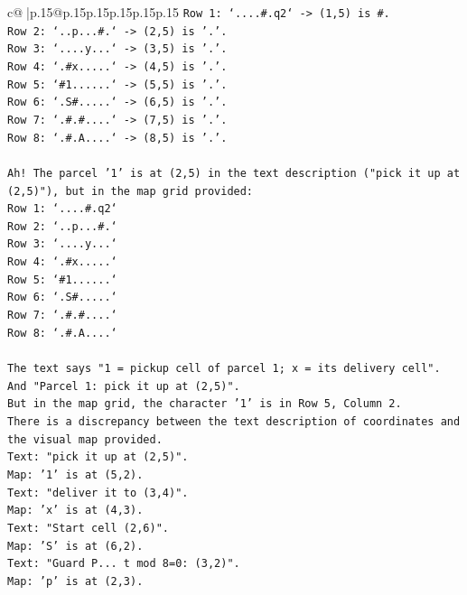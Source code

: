 \documentclass{article}
\begin{document}
{\begin{supertabular}{c@{$\;$}|p{.15\linewidth}@{}p{.15\linewidth}p{.15\linewidth}p{.15\linewidth}p{.15\linewidth}p{.15\linewidth}}
{{{\texttt{Row 1: `....\#.q2` {-}> (1,5) is \#.} \\
\texttt{Row 2: `..p...\#.` {-}> (2,5) is '.'.} \\
\texttt{Row 3: `....y...` {-}> (3,5) is '.'.} \\
\texttt{Row 4: `.\#x.....` {-}> (4,5) is '.'.} \\
\texttt{Row 5: `\#1......` {-}> (5,5) is '.'.} \\
\texttt{Row 6: `.S\#.....` {-}> (6,5) is '.'.} \\
\texttt{Row 7: `.\#.\#....` {-}> (7,5) is '.'.} \\
\texttt{Row 8: `.\#.A....` {-}> (8,5) is '.'.} \\
\\ 
\texttt{Ah! The parcel '1' is at (2,5) in the text description ("pick it up at (2,5)"), but in the map grid provided:} \\
\texttt{Row 1: `....\#.q2`} \\
\texttt{Row 2: `..p...\#.`} \\
\texttt{Row 3: `....y...`} \\
\texttt{Row 4: `.\#x.....`} \\
\texttt{Row 5: `\#1......`} \\
\texttt{Row 6: `.S\#.....`} \\
\texttt{Row 7: `.\#.\#....`} \\
\texttt{Row 8: `.\#.A....`} \\
\\ 
\texttt{The text says "1 = pickup cell of parcel 1; x = its delivery cell".} \\
\texttt{And "Parcel 1: pick it up at (2,5)".} \\
\texttt{But in the map grid, the character '1' is in Row 5, Column 2.} \\
\texttt{There is a discrepancy between the text description of coordinates and the visual map provided.} \\
\texttt{Text: "pick it up at (2,5)".} \\
\texttt{Map: '1' is at (5,2).} \\
\texttt{Text: "deliver it to (3,4)".} \\
\texttt{Map: 'x' is at (4,3).} \\
\texttt{Text: "Start cell (2,6)".} \\
\texttt{Map: 'S' is at (6,2).} \\
\texttt{Text: "Guard P... t mod 8=0: (3,2)".} \\
\texttt{Map: 'p' is at (2,3).} \\
}}}
\end{supertabular}}
\end{document}
